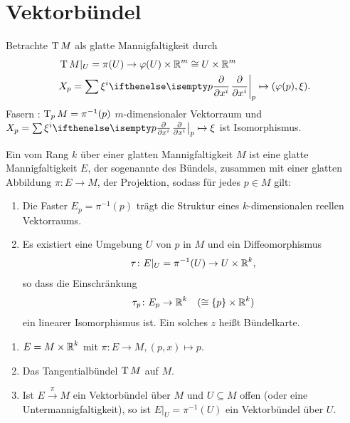 \chapter{Vektorbündel}

Betrachte $\operatorname{T} M$ als glatte Mannigfaltigkeit durch
\begin{align*}
  & \T M|_U = \pi(U) \to \varphi(U) \times \R^m \cong U \times \R^m\\
  & X_p = \sum \xi^i\pdifffrac[p]{}{x^i} \mapsto (\varphi(p),\xi).
\end{align*}
Fasern : $\operatorname{T}_pM = \pi^{-1}(p)$ $m$-dimensionaler Vektorraum und $X_p = \sum \xi^i \pdifffrac[p]{}{x^i} \mapsto \xi$ ist Isomorphismus.

\begin{Dfn}
  Ein  vom Rang $k$ über einer glatten Mannigfaltigkeit $M$ ist eine glatte Mannigfaltigkeit $E$, der sogenannte  des Bündels, zusammen mit einer glatten Abbildung $\pi \colon E \to M$, der Projektion, sodass für jedes $p \in M$ gilt:
  \begin{enumerate}[label=(\roman*)]
  \item Die Faster $E_p = \pi^{-1}(p)$ trägt die Struktur eines $k$-dimensionalen reellen Vektorraums.
  \item Es existiert eine Umgebung $U$ von $p$ in $M$ und ein Diffeomorphismus
    \begin{align*}
      \tau \colon E|_U = \pi^{-1}(U) \to U \times \operatorname{\mathbb{R}}^k,
    \end{align*}
    so dass die Einschränkung
    \begin{align*}
      \tau_p \colon E_p \to \operatorname{\mathbb{R}}^k \quad ( \cong \{p\} \times \operatorname{\mathbb{R}}^k)
    \end{align*}
    ein linearer Isomorphismus ist.
    Ein solches $z$ heißt Bündelkarte.
  \end{enumerate}
\end{Dfn}

\begin{bsp}
  \begin{enumerate}[label=(\arabic*)]
  \item $E = M \times \operatorname{\mathbb{R}}^k$ mit $\pi \colon E \to M, (p,x) \mapsto p$.
  \item Das Tangentialbündel $\operatorname{T} M$ auf $M$.
  \item Ist $E \xrightarrow{\pi} M$ ein Vektorbündel über $M$ und $U \subseteq M$ offen (oder eine Untermannigfaltigkeit), so ist $E|_U = \pi^{-1}(U)$ ein Vektorbündel über $U$.
  \end{enumerate}
\end{bsp}

